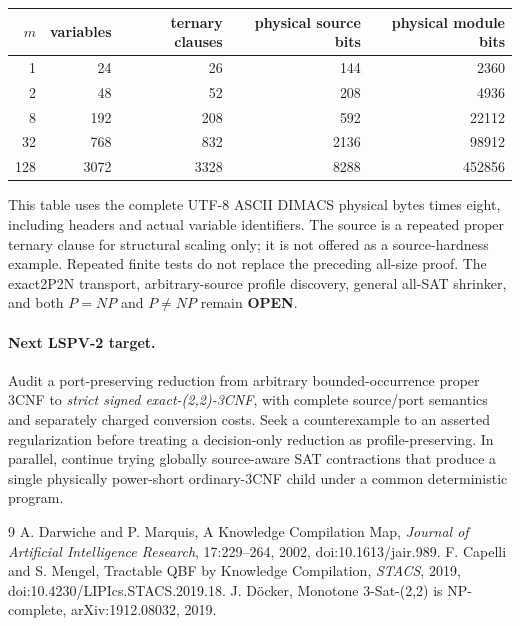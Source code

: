 \documentclass[11pt]{article}
\begin{document}
\begin{center}\begin{tabular}{rrrrr}\toprule
$m$ & variables & ternary clauses & physical source bits & physical module bits\\\midrule
1&24&26&144&2360\\
2&48&52&208&4936\\
8&192&208&592&22112\\
32&768&832&2136&98912\\
128&3072&3328&8288&452856\\\bottomrule\end{tabular}\end{center}
This table uses the complete UTF-8 ASCII DIMACS physical bytes times eight, including headers and actual variable identifiers. The source is a repeated proper ternary clause for structural scaling only; it is not offered as a source-hardness example. Repeated finite tests do not replace the preceding all-size proof. The exact2P2N transport, arbitrary-source profile discovery, general all-SAT shrinker, and both $P=NP$ and $P\ne NP$ remain \textbf{OPEN}.

\paragraph{Next LSPV-2 target.} Audit a port-preserving reduction from arbitrary bounded-occurrence proper 3CNF to \emph{strict signed exact-(2,2)-3CNF}, with complete source/port semantics and separately charged conversion costs. Seek a counterexample to an asserted regularization before treating a decision-only reduction as profile-preserving. In parallel, continue trying globally source-aware SAT contractions that produce a single physically power-short ordinary-3CNF child under a common deterministic program.

\begin{thebibliography}{9}
 A. Darwiche and P. Marquis, A Knowledge Compilation Map, \emph{Journal of Artificial Intelligence Research}, 17:229--264, 2002, doi:10.1613/jair.989.
 F. Capelli and S. Mengel, Tractable QBF by Knowledge Compilation, \emph{STACS}, 2019, doi:10.4230/LIPIcs.STACS.2019.18.
 J. D\"ocker, Monotone 3-Sat-(2,2) is NP-complete, arXiv:1912.08032, 2019.
\end{thebibliography}
\end{document}
